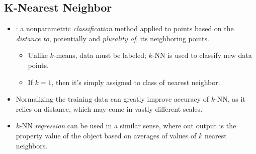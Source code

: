 \begin{itemize}
  \subsection{K-Nearest Neighbor}
  \begin{itemize}
    \item {}: a nonparametric \emph{classification} method applied to points based on the \emph{distance to}, potentially and \emph{plurality of}, its neighboring points.
      \begin{itemize}
        \item Unlike \(k\)-means, data must be labeled; \(k\)-NN is used to classify new data points. 
        \item If \(k=1\), then it's simply assigned to class of nearest neighbor.
      \end{itemize}
    \item Normalizing the training data can greatly improve accuracy of \(k\)-NN, as it relies on distance, which may come in vastly different scales.
    \item \(k\)-NN \emph{regression} can be used in a similar sense, where out output is the property value of the object based on averages of values of \(k\) nearest neighbors.
  \end{itemize}
  
\end{itemize}

